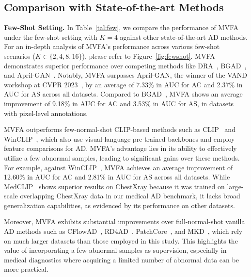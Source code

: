 \subsection{Comparison with State-of-the-art Methods}
\noindent\textbf{Few-Shot Setting.} In Table~\ref{tal:few}, we compare the performance of MVFA under the few-shot setting with $K=4$ against other state-of-the-art AD methods. For an in-depth analysis of MVFA's performance across various few-shot scenarios ($K\in\{2,4,8,16\}$), please refer to Figure~\ref{fig:fewshot}. MVFA demonstrates superior performance over competing methods like DRA~\cite{DRA}, BGAD~\cite{BGAD}, and April-GAN~\cite{chen2023zero}. Notably, MVFA surpasses April-GAN, the winner of the VAND workshop at CVPR 2023~\cite{vand}, by an average of 7.33\% in AUC for AC and 2.37\% in AUC for AS across all datasets. Compared to BGAD~\cite{BGAD}, MVFA shows an average improvement of 9.18\% in AUC for AC and 3.53\% in AUC for AS, in datasets with pixel-level annotations.

MVFA outperforms few-normal-shot CLIP-based methods such as CLIP~\cite{openclip} and WinCLIP~\cite{winclip}, which also use visual-language pre-trained backbones and employ feature comparisons for AD. MVFA's advantage lies in its ability to effectively utilize a few abnormal samples, leading to significant gains over these methods. For example, against WinCLIP~\cite{winclip}, MVFA achieves an average improvement of 12.60\% in AUC for AC and 2.81\% in AUC for AS across all datasets. While MedCLIP~\cite{wang2022medclip} shows superior results on ChestXray because it was trained on large-scale overlapping ChestXray data in our medical AD benchmark, it lacks broad generalization capabilities, as evidenced by its performance on other datasets.

Moreover, MVFA exhibits substantial improvements over full-normal-shot vanilla AD methods such as CFlowAD~\cite{gudovskiy2022cflow}, RD4AD~\cite{deng2022anomaly}, PatchCore~\cite{patchcore}, and MKD~\cite{MKD}, which rely on much larger datasets than those employed in this study. This highlights the value of incorporating a few abnormal samples as supervision, especially in medical diagnostics where acquiring a limited number of abnormal data can be more practical.

